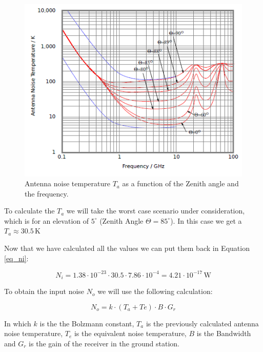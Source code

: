 \documentclass[a4paper,12pt,calibri,oneside,openany]{book}
\newcommand{\unit}[1]{\ensuremath{\, \mathrm{#1}}}
\theoremstyle{break}
\begin{document}
		\begin{figure}[h]
			\centering
			\includegraphics[width=14cm]{graph_TA}
			\caption{Antenna noise temperature $T_{a}$ as a function of the Zenith angle and the frequency.}
			\label{graph_TA}
		\end{figure}
		
		
		To calculate the $T_{a}$ we will take the worst case scenario under consideration, which is for an elevation of $5^{\circ}$ (Zenith Angle $\Theta = 85^{\circ}$). In this case we get a $T_{a} \approx 30.5 \unit{K} $
	
		Now that we have calculated all the values we can put them back in Equation \ref{eq_ni}:
	
		\begin{equation} \label{eq_ni2}
			N_{i} = 1.38 \cdot 10^{-23} \cdot 30.5 \cdot 7.86 \cdot 10^{-4} = 4.21 \cdot 10^{-17} \unit{W}
		\end{equation}
	
		To obtain the input noise $N_{o}$ we will use the following calculation:
		
		\begin{equation} \label{eq_no}
			N_{o} = k \cdot \left(T_{a} + T{e} \right) \cdot B \cdot G_{r} 
		\end{equation}
	
		In which $k$ is the the Bolzmann constant, $T_{a}$ is the previously calculated antenna noise temperature, $T_{e}$ is the equivalent noise temperature, $B$ is the Bandwidth and $G_{r}$ is the gain of the receiver in the ground station. 
		
\end{document}
